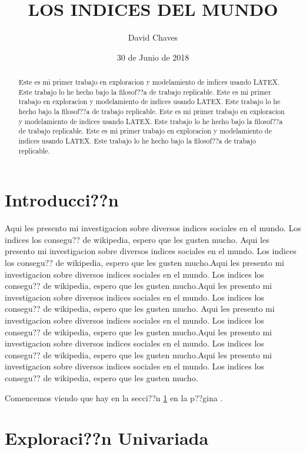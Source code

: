 \documentclass{article}
\title{LOS INDICES DEL MUNDO}
\author[1]{\normalsize David Chaves}
\affil[1,2]{\small  Escuela de Ingenierria,Universidad de los Andes\\
\texttt{{delcurso,deallado}@uniandes.edu.col}}
\affil[1]{\small Instituto de altas investigaciones financieras\\
Banco del Parque\\
\texttt{delcurso@bp.com.col}}
\date{30 de Junio de 2018}
\begin{document}


\maketitle


\begin{abstract}
Este es mi primer trabajo en exploracion y modelamiento de indices usando LATEX. Este trabajo lo he hecho bajo la filosof??a de trabajo replicable. Este es mi primer trabajo en exploracion y modelamiento de indices usando LATEX. Este trabajo lo he hecho bajo la filosof??a de trabajo replicable. Este es mi primer trabajo en exploracion y modelamiento de indices usando LATEX. Este trabajo lo he hecho bajo la filosof??a de trabajo replicable. Este es mi primer trabajo en exploracion y modelamiento de indices usando LATEX. Este trabajo lo he hecho bajo la filosof??a de trabajo replicable.
\end{abstract}

\section*{Introducci??n}

Aqui les presento mi investigacion sobre diversos indices sociales en el mundo. Los indices los consegu?? de wikipedia, espero que les gusten mucho. Aqui les presento mi investigacion sobre diversos indices sociales en el mundo. Los indices los consegu?? de wikipedia, espero que les gusten mucho.Aqui les presento mi investigacion sobre diversos indices sociales en el mundo. Los indices los consegu?? de wikipedia, espero que les gusten mucho.Aqui les presento mi investigacion sobre diversos indices sociales en el mundo. Los indices los consegu?? de wikipedia, espero que les gusten mucho.
Aqui les presento mi investigacion sobre diversos indices sociales en el mundo. Los indices los consegu?? de wikipedia, espero que les gusten mucho.Aqui les presento mi investigacion sobre diversos indices sociales en el mundo. Los indices los consegu?? de wikipedia, espero que les gusten mucho.Aqui les presento mi investigacion sobre diversos indices sociales en el mundo. Los indices los consegu?? de wikipedia, espero que les gusten mucho.

Comencemos viendo que hay en la secci??n \ref{univariada} en la p??gina \pageref{univariada}.

\clearpage



\section{Exploraci??n Univariada}\label{univariada}
\end{document}
